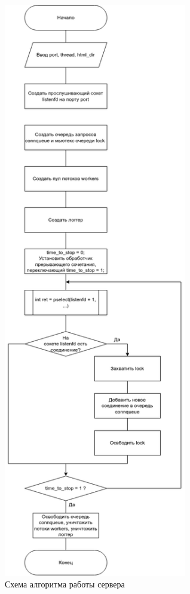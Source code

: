 \begin{figure}[h!]
	\centering
	\captionsetup{justification=centering}
	\includegraphics[width=80mm]{img/server.png}
	\caption{Схема алгоритма работы сервера}
	\label{fig:server}
\end{figure}

